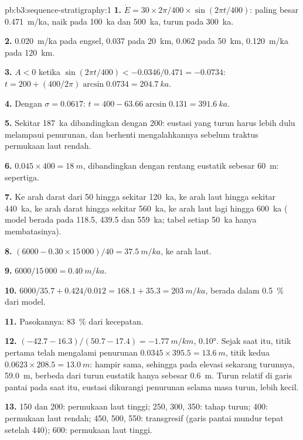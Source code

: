 \begin{solution}{pb:b3:sequence-stratigraphy:1}
\textbf{1.} $\dot E = 30\times2\pi/400\times\sin(2\pi t/400)$: paling besar
\qty{0.471}{m/ka}, naik pada \qty{100}{ka} dan \qty{500}{ka}, turun pada
\qty{300}{ka}.

\textbf{2.} \qty{0.020}{m/ka} pada engsel, 0.037 pada \qty{20}{km}, 0.062 pada
\qty{50}{km}, \qty{0.120}{m/ka} pada \qty{120}{km}.

\textbf{3.} $A < 0$ ketika $\sin(2\pi t/400) < -0.0346/0.471 = -0.0734$: $t =
200 + (400/2\pi)\arcsin0.0734 = \qty{204.7}{ka}$.

\textbf{4.} Dengan $\sigma = 0.0617$: $t = 400 - 63.66\arcsin0.131 =
\qty{391.6}{ka}$.

\textbf{5.} Sekitar \qty{187}{ka} dibandingkan dengan 200: eustasi yang turun harus lebih dulu
melampaui penurunan, dan berhenti mengalahkannya sebelum traktus permukaan laut rendah.

\textbf{6.} $0.045\times400 = \qty{18}{m}$, dibandingkan dengan rentang eustatik sebesar
\qty{60}{m}: sepertiga.

\textbf{7.} Ke arah darat dari 50 hingga sekitar \qty{120}{ka}, ke arah laut hingga sekitar
\qty{440}{ka}, ke arah darat hingga sekitar \qty{560}{ka}, ke arah laut lagi hingga
\qty{600}{ka} ( model berada pada 118.5, 439.5 dan
\qty{559}{ka}; tabel setiap \qty{50}{ka} hanya membatasinya).

\textbf{8.} $(6000 - 0.30\times15\,000)/40 = \qty{37.5}{m/ka}$, ke arah laut.

\textbf{9.} $6000/15\,000 = \qty{0.40}{m/ka}$.

\textbf{10.} $6000/35.7 + 0.424/0.012 = 168.1 + 35.3 = \qty{203}{m/ka}$,
berada dalam \qty{0.5}{\percent} dari model.

\textbf{11.} Pasokannya: \qty{83}{\percent} dari kecepatan.

\textbf{12.} $(-42.7 - 16.3)/(50.7 - 17.4) = \qty{-1.77}{m/km}$, \ang{0.10}.
Sejak saat itu, titik pertama telah mengalami penurunan $0.0345\times395.5 =
\qty{13.6}{m}$, titik kedua $0.0623\times208.5 = \qty{13.0}{m}$: hampir
sama, sehingga pada elevasi sekarang turunnya, \qty{59.0}{m}, berbeda dari
turun eustatik hanya sebesar \qty{0.6}{m}. Turun relatif di garis pantai pada
saat itu, eustasi dikurangi penurunan selama masa turun, lebih kecil.

\textbf{13.} 150 dan 200: permukaan laut tinggi; 250, 300, 350: tahap turun; 400:
permukaan laut rendah; 450, 500, 550: transgresif (garis pantai mundur tepat setelah
440); 600: permukaan laut tinggi.


\end{solution}
